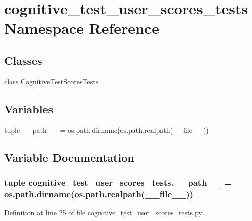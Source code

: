 \hypertarget{namespacecognitive__test__user__scores__tests}{\section{cognitive\-\_\-test\-\_\-user\-\_\-scores\-\_\-tests Namespace Reference}
\label{namespacecognitive__test__user__scores__tests}
}
\subsection*{Classes}
\begin{DoxyCompactItemize}
\item 
class \hyperlink{classcognitive__test__user__scores__tests_1_1CognitiveTestScoresTests}{Cognitive\-Test\-Scores\-Tests}
\end{DoxyCompactItemize}
\subsection*{Variables}
\begin{DoxyCompactItemize}
\item 
tuple \hyperlink{namespacecognitive__test__user__scores__tests_a7a166dc9c1bedee50d48fcd4333ccd14}{\-\_\-\-\_\-path\-\_\-\-\_\-} = os.\-path.\-dirname(os.\-path.\-realpath(\-\_\-\-\_\-file\-\_\-\-\_\-))
\end{DoxyCompactItemize}


\subsection{Variable Documentation}
\hypertarget{namespacecognitive__test__user__scores__tests_a7a166dc9c1bedee50d48fcd4333ccd14}{
\subsubsection[{\-\_\-\-\_\-path\-\_\-\-\_\-}]{\setlength{\rightskip}{0pt plus 5cm}tuple cognitive\-\_\-test\-\_\-user\-\_\-scores\-\_\-tests.\-\_\-\-\_\-path\-\_\-\-\_\- = os.\-path.\-dirname(os.\-path.\-realpath(\-\_\-\-\_\-file\-\_\-\-\_\-))}}\label{namespacecognitive__test__user__scores__tests_a7a166dc9c1bedee50d48fcd4333ccd14}


Definition at line 25 of file cognitive\-\_\-test\-\_\-user\-\_\-scores\-\_\-tests.\-py.

